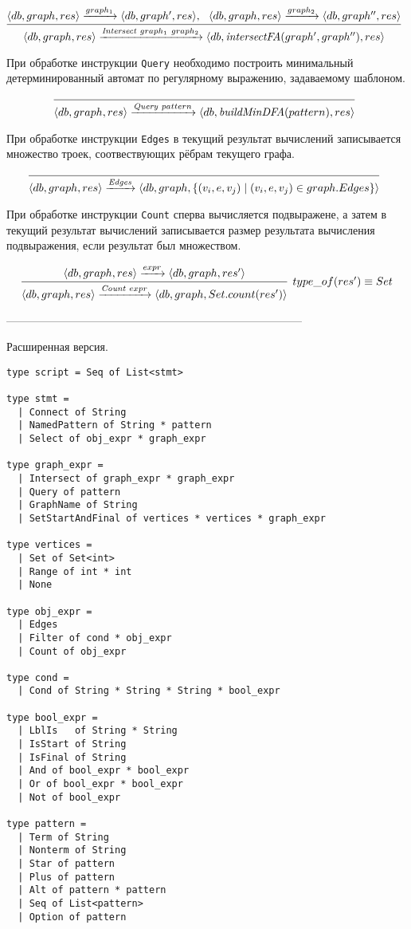 $$
\infer[]{\langle db, graph, res\rangle \xrightarrow{\textit{Intersect} \ graph_1 \ graph_2} \langle db, \textit{intersectFA}(graph', graph''), res\rangle}{\langle db, graph,res\rangle \xrightarrow{graph_1} \langle db, graph', res \rangle, \ \ \langle db, graph,res \rangle \xrightarrow{graph_2} \langle db, graph'', res \rangle}
$$


При обработке инструкции \verb|Query| необходимо построить минимальный детерминированный автомат по регулярному выражению, задаваемому шаблоном.

$$
\infer[]{\langle db, graph, res \rangle \xrightarrow{\textit{Query} \ pattern} \langle db, \textit{buildMinDFA}(pattern), res \rangle}{}
$$

При обработке инструкции \verb|Edges| в текущий результат вычислений записывается множество троек, соотвествующих рёбрам текущего графа.

$$
\infer[]{\langle db, graph, res \rangle \xrightarrow{\textit{Edges}} \langle db, graph, \{(v_i,e,v_j) \mid (v_i,e,v_j) \in graph.Edges\}\rangle}{}
$$

При обработке инструкции \verb|Count| сперва вычисляется подвыражене, а затем в текущий результат вычислений записывается размер результата вычисления подвыражения, если результат был множеством.

$$
\infer[type\_of(res') \equiv Set ]{\langle db, graph, res \rangle \xrightarrow{\textit{Count} \ expr} \langle db, graph, Set.count(res') \rangle}{\langle db, graph, res \rangle \xrightarrow{expr} \langle db, graph, res' \rangle}
$$

--------------------------------------------------------------------------------




Расширенная версия.

\begin{verbatim}
type script = Seq of List<stmt>

type stmt =
  | Connect of String
  | NamedPattern of String * pattern
  | Select of obj_expr * graph_expr

type graph_expr =
  | Intersect of graph_expr * graph_expr 
  | Query of pattern
  | GraphName of String
  | SetStartAndFinal of vertices * vertices * graph_expr

type vertices =
  | Set of Set<int>
  | Range of int * int
  | None   

type obj_expr =
  | Edges
  | Filter of cond * obj_expr
  | Count of obj_expr
  
type cond = 
  | Cond of String * String * String * bool_expr

type bool_expr = 
  | LblIs   of String * String
  | IsStart of String
  | IsFinal of String
  | And of bool_expr * bool_expr
  | Or of bool_expr * bool_expr
  | Not of bool_expr

type pattern = 
  | Term of String
  | Nonterm of String
  | Star of pattern
  | Plus of pattern
  | Alt of pattern * pattern
  | Seq of List<pattern>
  | Option of pattern

\end{verbatim}



